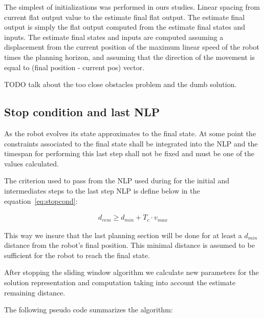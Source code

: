 \documentclass[eprint]{actapoly}
\begin{document}
The simplest of initializations was performed in ours studies. Linear spacing from current flat output value to the estimate final flat output.
The estimate final output is simply the flat output computed from the estimate final states and inputs. The estimate final states and inputs
are computed assuming a displacement from the current position of the maximum linear speed
of the robot times the planning horizon, and assuming that the direction of the movement is equal to (final position - current pos) vector.

TODO talk about the too close obstacles problem and the dumb solution.

\subsection{Stop condition and last NLP}


As the robot evolves its state approximates to the final state. 
At some point the constraints associated to the final state shall be integrated into the NLP and the timespan for performing this last
step shall not be fixed and must be one of the values calculated.

The criterion used to pass from the NLP used during for the initial and intermediates steps to the last step NLP 
is define below in the equation~\ref{eq:stopcond}:

\begin{align}
  d_{rem} \geq d_{min} + T_c \cdot v_{max}
\end{align}

This way we insure that the last planning section will be done for at least a $d_{min}$ distance from the robot's final position.
This minimal distance is assumed to be sufficient for the robot to reach the final state.

After stopping the sliding window algorithm we calculate new parameters for the solution representation and computation taking into
account the estimate remaining distance.

The following pseudo code summarizes the algorithm: 
\end{document}
